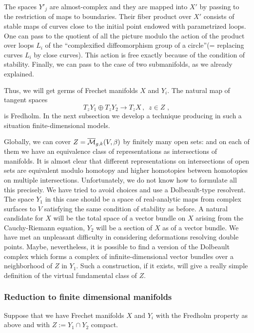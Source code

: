 \documentclass{amsart}
\begin{document}
The spaces $Y'_j$ are almost-complex and they are mapped into $X'$ by passing
to the  restriction  of maps to  boundaries. Their fiber product over $X'$
consists of stable maps of curves close to the initial point endowed with
parametrized loops. One can pass to the quotient of all the picture modulo the
action of  the product over loops $L_i$  of the ``complexified diffeomorphism
group of a circle''(= replacing curves $L_i$ by close curves). This action is
free exactly because of the condition of stability. Finally, we can pass to the
case of two submanifolds, as we already explained.

Thus, we will get germs of Frechet manifolds $X$ and $Y_i$. The natural map of
tangent spaces
$$T_zY_1\oplus T_zY_2\to T_zX\,,\,\,\,z\in Z\,\,,$$
is Fredholm.
In the next subsection we develop a technique producing in such a situation
finite-dimensional models.


Globally, we can cover $Z=\overline{\mathcal{M}}_{g,k}(V,\beta)$ by finitely many open sets: and on
each of them  we have an equivalence class of representations as intersections
of manifolds. It is almost clear
 that different representations on intersections of  open sets
 are equivalent modulo homotopy and higher homotopies between homotopies on
multiple intersections. Unfortunately, we do not know
 how to formulate all this  precisely.
We have tried to avoid choices and use a Dolbeault-type resolvent.
 The  space $Y_1$ in this case should be a space of real-analytic maps from
complex surfaces to $V$ satisfying the same condition of stability as before. A
natural candidate for $X$ will be the total space of a vector bundle on $X$
arising from the Cauchy-Riemann equation, $Y_2$ will be a section of $X$ as of
a vector bundle.  We  have  met an unpleasant difficulty
 in considering deformations resolving double points. Maybe, nevertheless, it
is possible to find a  version of the Dolbeault complex which forms   a complex
of infinite-dimensional vector  bundles over a neighborhood of $Z$ in $Y_1$.
Such a construction, if it exists, will give a really simple definition of the
virtual fundamental class of $Z$.



\subsubsection{Reduction to finite dimensional manifolds}

Suppose that we have Frechet manifolds $X$ and $Y_i$ with the  Fredholm
property as above and with $Z:=Y_1\cap Y_2$  compact.
\end{document}
